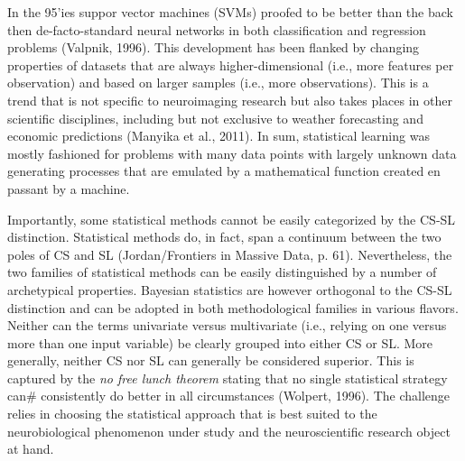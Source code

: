 \documentclass[authoryear,review,3p]{elsarticle}
\begin{document}
In the 95'ies suppor vector machines (SVMs)
proofed to be better than the back then de-facto-standard neural networks
in both classification and regression problems (Valpnik, 1996).
This development has been flanked by changing properties of datasets that
are always higher-dimensional (i.e., more features per observation)
and
based
on larger samples (i.e., more observations).
This is a trend that is not specific to
neuroimaging research but also takes places
in other scientific disciplines,
including but not exclusive to weather forecasting and economic predictions
(Manyika et al., 2011).
In sum,
statistical learning was mostly fashioned
for problems with many data points with largely unknown
data generating processes
that are emulated by a mathematical function
created en passant by a machine.


Importantly, some statistical
methods cannot be easily categorized by the CS-SL distinction.
Statistical methods do, in fact, span a continuum between the two poles of CS and SL
(Jordan/Frontiers in Massive Data, p. 61).
Nevertheless, the two families of statistical methods
can be easily distinguished by a number of archetypical properties.
Bayesian statistics are however orthogonal to the CS-SL distinction
and can be adopted in both methodological families in various flavors.
%
Neither can the terms univariate versus multivariate
(i.e., relying on one versus more than one input variable)
be clearly grouped into either CS or SL.
%
More generally,
neither CS nor SL can generally be considered superior.
This is captured by the \textit{no free lunch theorem}
stating that no single statistical strategy can#
consistently do better in all circumstances (Wolpert, 1996).
The challenge relies in choosing
the statistical approach that is best suited
to the neurobiological phenomenon under study and the neuroscientific research object at hand.
\end{document}
